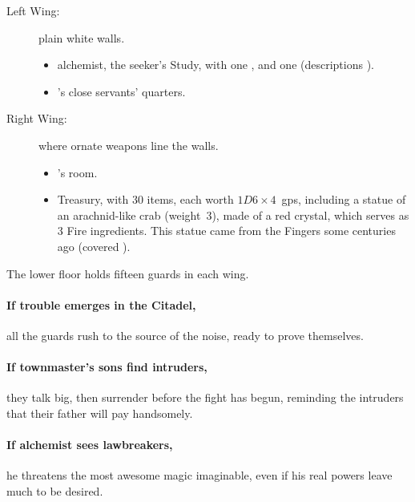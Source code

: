 \begin{multicols}{2}
\begin{description}
\begin{description}
      \item[Left Wing:]
      plain white walls.
      \begin{itemize}
        \item
        \gls{alchemist}, the \gls{seeker}'s Study, with one \lootTalisman, and one \lootTalisman (descriptions ).
        \item
        's close servants' quarters.
      \end{itemize}
      \item[Right Wing:]
      where ornate weapons line the walls.
      \begin{itemize}
        \item
        's room.
        \item
        Treasury, with 30 items, each worth $1D6\times 4$~\glspl{gp}, including a statue of an arachnid-like crab (\gls{weight}~3), made of a red crystal, which serves as 3 Fire \glspl{ingredient}.
        This statue came from the Fingers some centuries ago (covered ).
      \end{itemize}
    \end{description}
\end{description}

The lower floor holds fifteen guards in each wing.


\paragraph{If trouble emerges in the Citadel,}
all the guards rush to the source of the noise, ready to prove themselves.


\paragraph{If \gls{townmaster}'s sons find intruders,}
they talk big, then surrender before the fight has begun, reminding the intruders that their father will pay handsomely.

\citadelAlchemist
\label{citadel_alchemist}

\showStdSpells

\paragraph{If \gls{alchemist} sees lawbreakers,}
he threatens the most awesome magic imaginable, even if his real powers leave much to be desired.


\end{multicols}
